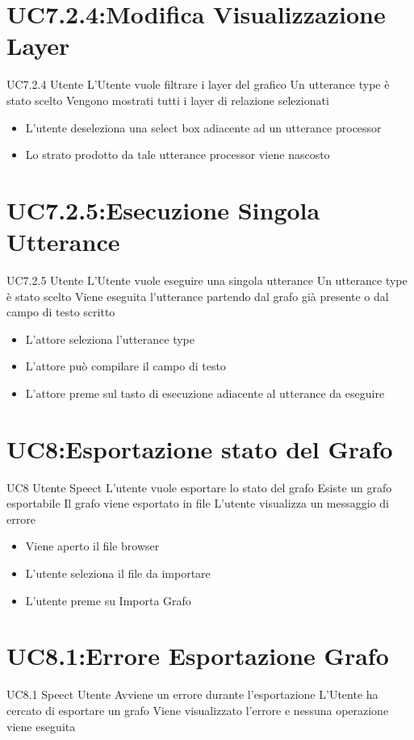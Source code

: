 \documentclass[../AnalisideiRequisiti.tex]{subfiles}
\begin{document}
\section{UC7.2.4:Modifica Visualizzazione Layer}
\UserCase
{UC7.2.4}
{Utente}
{}
{L'Utente vuole filtrare i layer del grafico}
{Un utterance type è stato scelto }
{Vengono mostrati tutti i layer di relazione selezionati}
{}
{\begin{itemize}
		\item{} L'utente deseleziona una select box adiacente ad un utterance processor
		\item{} Lo strato prodotto da tale utterance processor viene nascosto
\end{itemize}
}
\section{UC7.2.5:Esecuzione Singola Utterance}
\UserCase
{UC7.2.5}
{Utente}
{}
{L'Utente vuole eseguire una singola utterance}
{Un utterance type è stato scelto  }
{Viene eseguita l'utterance partendo dal grafo già presente o dal campo di testo scritto}
{}
{\begin{itemize}
				\item{} L'attore seleziona l'utterance type
		\item{} L'attore può compilare il campo di testo
		\item{} L'attore preme sul tasto di esecuzione adiacente al utterance da eseguire 
	\end{itemize}
}

\section{UC8:Esportazione stato del Grafo}
\UserCase
{UC8}
{Utente}
{Speect}
{L'utente vuole esportare lo stato del grafo}
{Esiste un grafo esportabile}
{Il grafo viene esportato in file}
{ L'utente visualizza un messaggio di errore }
{
	{\begin{itemize}
			\item{} Viene aperto il file browser
			\item{} L'utente seleziona il file da importare
			\item{} L'utente preme su Importa Grafo
\end{itemize}}}

\section{UC8.1:Errore Esportazione Grafo}
\UserCase
{UC8.1}
{Speect}
{Utente}
{Avviene un errore durante l'esportazione}
{L'Utente ha cercato di esportare un grafo}
{Viene visualizzato l'errore e nessuna operazione viene eseguita}
{}
{}
\end{document}

